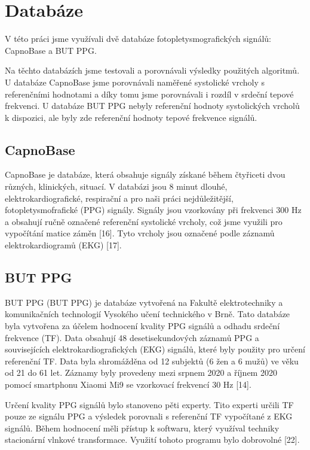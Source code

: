 \chapter{Databáze}

V této práci jsme využívali dvě databáze fotopletysmografických signálů: CapnoBase a BUT PPG.

Na těchto databázích jsme testovali a porovnávali výsledky použitých algoritmů.
U databáze CapnoBase jsme porovnávali naměřené systolické vrcholy s referenčními hodnotami a díky tomu jsme porovnávali i rozdíl v srdeční tepové frekvenci.
U databáze BUT PPG nebyly referenční hodnoty systolických vrcholů k dispozici, ale byly zde referenční hodnoty tepové frekvence signálů.

\section{CapnoBase}

CapnoBase je databáze, která obsahuje signály získané během čtyřiceti dvou různých, klinických, situací.
V databázi jsou 8 minut dlouhé, elektrokardiografické, respirační a pro naši práci nejdůležitější, fotopletysmofrafické (PPG) signály.
Signály jsou vzorkovány při frekvenci 300 Hz a obsahují ručně označené referenční systolické vrcholy, což jsme využili pro vypočítání matice záměn [16].
Tyto vrcholy jsou označené podle záznamů elektrokardiogramů (EKG) [17].

\section{BUT PPG}

\acl{BUT PPG} (\acs{BUT PPG}) je databáze vytvořená na Fakultě elektrotechniky a komunikačních technologií Vysokého učení technického v Brně.
Tato databáze byla vytvořena za účelem hodnocení kvality PPG signálů a odhadu srdeční frekvence (TF).
Data obsahují 48 desetisekundových záznamů PPG a souvisejících elektrokardiografických (EKG) signálů, které byly použity pro určení referenční TF.
Data byla shromážděna od 12 subjektů (6 žen a 6 mužů) ve věku od 21 do 61 let.
Záznamy byly provedeny mezi srpnem 2020 a říjnem 2020 pomocí smartphonu Xiaomi Mi9 se vzorkovací frekvencí 30 Hz [14].

Určení kvality PPG signálů bylo stanoveno pěti experty.
Tito experti určili TF pouze ze signálu PPG a výsledek porovnali s referenční TF vypočítané z EKG signálů.
Během hodnocení měli přístup k softwaru, který využíval techniky stacionární vlnkové transformace.
Využití tohoto programu bylo dobrovolné [22].

